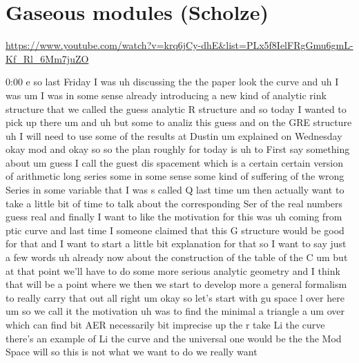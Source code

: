 
\section{\ufs Gaseous modules (Scholze)}

\url{https://www.youtube.com/watch?v=krq6jCy-dhE&list=PLx5f8IelFRgGmu6gmL-Kf_Rl_6Mm7juZO}
\renewcommand{\yt}[2]{\href{https://www.youtube.com/watch?v=krq6jCy-dhE&list=PLx5f8IelFRgGmu6gmL-Kf_Rl_6Mm7juZO&t=#1}{#2}}
\vspace{1em}

\begin{unfinished}{0:00}
e
so  last  Friday  I  was  uh  discussing  the
the  paper  look  the  curve  and  uh  I  was  um
I  was  in  some  sense  already  introducing
a  new  kind  of  analytic  rink  structure
that  we  called  the  guess  analytic  R
structure  and  so  today  I  wanted  to  pick
up  there  um  and  uh  but  some  to  analiz
this  guess  and  on  the  GRE  structure  uh  I
will  need  to  use  some  of  the  results  at
Dustin  um  explained  on
Wednesday
okay
mod  and  okay  so  so  the  plan  roughly  for
today  is  uh  to  First  say  something  about
um
guess  I  call  the  guest  dis
spacement  which  is  a  certain  certain
version  of  arithmetic  long
series  some  in  some  sense  some  kind  of
suffering  of  the  wrong  Series  in  some
variable  that  I  was  s  called  Q  last  time
um
then  actually  want  to  take  a  little  bit
of  time  to  talk  about  the  corresponding
Ser  of  the  real  numbers  guess
real  and  finally  I  want  to  like  the
motivation  for  this  was  uh  coming  from
ptic  curve  and  last  time  I  someone
claimed  that  this
G  structure  would  be  good  for  that  and  I
want  to  start  a  little  bit  explanation
for  that
so  I  want  to  say  just  a  few  words  uh
already  now  about  the
construction  of  the  table  of  the
C
um  but  at  that  point  we'll  have  to  do
some  more  serious  analytic  geometry  and
I  think  that  will  be  a  point  where  we
then  we  start  to  develop  more  a  general
formalism  to  really  carry  that
out  all  right  um  okay  so  let's  start
with  gu  space
l
over  here
um  so  we  call  it  the
motivation  uh  was  to  find
the
minimal
a  triangle
a  um  over  which  can  find  bit
AER  necessarily  bit  imprecise  up  the  r
take  Li  the  curve  there's  an  example  of
Li  the  curve  and  the  universal  one  would
be  the  the  Mod  Space  will  so  this  is  not
what  we  want  to  do  we  really  want

\end{unfinished}
